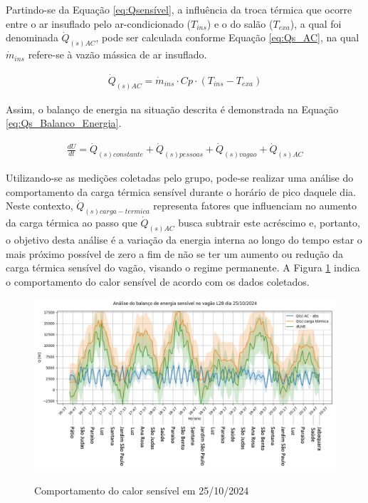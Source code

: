 \documentclass[acronym,symbols,table]{fei}
\begin{document}
Partindo-se da Equação \ref{eq:Qsensível}, a influência da troca térmica que ocorre entre o ar insuflado pelo ar-condicionado ($T_{ins}$) e o do salão ($T_{exa}$), a qual foi denominada $\dot{Q}_{(s)AC}$, pode ser calculada conforme Equação \ref{eq:Qs_AC}, na qual $\dot{m}_{ins}$ refere-se à vazão mássica de ar insuflado.

\begin{equation} \label{eq:Qs_AC}
    \begin{aligned}
    \dot{Q}_{(s)AC}= \dot{m}_{ins} \cdot Cp \cdot (T_{ins}-T_{exa})
    \end{aligned}
\end{equation}

Assim, o balanço de energia na situação descrita é demonstrada na Equação \ref{eq:Qs_Balanco_Energia}.

\begin{equation} \label{eq:Qs_Balanco_Energia}
    \begin{aligned}
    \frac{dU}{dt}=\dot{Q}_{(s)constante} + \dot{Q}_{(s)pessoas} + \dot{Q}_{(s)vagao} + \dot{Q}_{(s)AC}
    \end{aligned}
\end{equation}

Utilizando-se as medições coletadas pelo grupo, pode-se realizar uma análise do comportamento da carga térmica sensível durante o horário de pico daquele dia. Neste contexto,  $\dot{Q}_{(s)carga-termica}$ representa fatores que influenciam no aumento da carga térmica ao passo que $\dot{Q}_{(s)AC}$ busca subtrair este acréscimo e, portanto, o objetivo desta análise é a variação da energia interna ao longo do tempo estar o mais próximo possível de zero a fim de não se ter um aumento ou redução da carga térmica sensível do vagão, visando o regime permanente. A Figura \ref{fig:Qs_Dados_Coletados} indica o comportamento do calor sensível de acordo com os dados coletados.

\begin{figure}[!htb]
    \centering
    \caption{Comportamento do calor sensível em 25/10/2024}
    \includegraphics[width=0.8\linewidth]{Imagens/Qs_Dados_Coletados.png}
    \label{fig:Qs_Dados_Coletados}
\end{figure}
\end{document}

